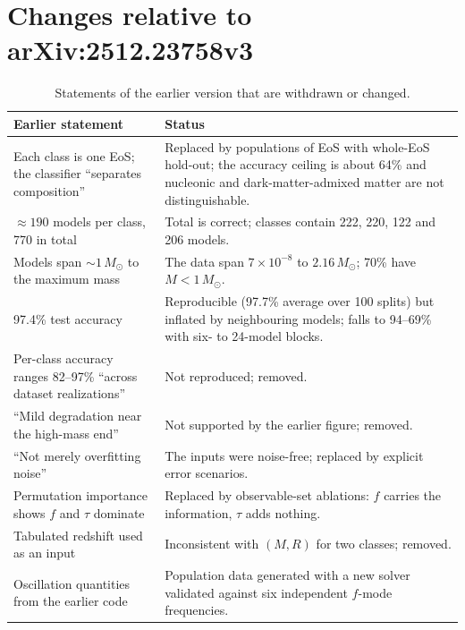 \documentclass[11pt,a4paper]{article}
\newcommand{\Msun}{M_\odot}
\begin{document}
\section{Changes relative to arXiv:2512.23758v3}\label{sec:changes}
\begin{table}[H]\centering\small\caption{Statements of the earlier version that are withdrawn or changed.}
\begin{tabular}{p{}p{}}\toprule
Earlier statement & Status\\\midrule
Each class is one EoS; the classifier ``separates composition'' & Replaced by populations of EoS with whole-EoS hold-out; the accuracy ceiling is about 64\% and nucleonic and dark-matter-admixed matter are not distinguishable.\\
$\approx190$ models per class, 770 in total & Total is correct; classes contain 222, 220, 122 and 206 models.\\
Models span $\sim1\,\Msun$ to the maximum mass & The data span $7\times10^{-8}$ to $2.16\,\Msun$; 70\% have $M<1\,\Msun$.\\
97.4\% test accuracy & Reproducible (97.7\% average over 100 splits) but inflated by neighbouring models; falls to 94--69\% with six- to 24-model blocks.\\
Per-class accuracy ranges 82--97\% ``across dataset realizations'' & Not reproduced; removed.\\
``Mild degradation near the high-mass end'' & Not supported by the earlier figure; removed.\\
``Not merely overfitting noise'' & The inputs were noise-free; replaced by explicit error scenarios.\\
Permutation importance shows $f$ and $\tau$ dominate & Replaced by observable-set ablations: $f$ carries the information, $\tau$ adds nothing.\\
Tabulated redshift used as an input & Inconsistent with $(M,R)$ for two classes; removed.\\
Oscillation quantities from the earlier code & Population data generated with a new solver validated against six independent $f$-mode frequencies.\\\bottomrule\end{tabular}\end{table}
\end{document}
